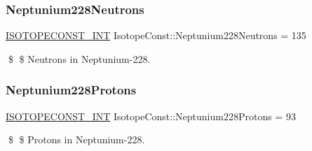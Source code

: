 \subsubsection{\texorpdfstring{Neptunium228\+Neutrons}{Neptunium228Neutrons}}
{\footnotesize\ttfamily \mbox{\hyperlink{group___isotope_const-_macros_ga5f18360b3e99483a35c32d789e62621c}{I\+S\+O\+T\+O\+P\+E\+C\+O\+N\+S\+T\+\_\+\+I\+NT}} Isotope\+Const\+::\+Neptunium228\+Neutrons = 135}

\$ \$ Neutrons in Neptunium-\/228. \mbox{\label{group___isotope_const-_neptunium-_np228_gad42a10ea338e37a020cce2d7ab9047d4}} 
\subsubsection{\texorpdfstring{Neptunium228\+Protons}{Neptunium228Protons}}
{\footnotesize\ttfamily \mbox{\hyperlink{group___isotope_const-_macros_ga5f18360b3e99483a35c32d789e62621c}{I\+S\+O\+T\+O\+P\+E\+C\+O\+N\+S\+T\+\_\+\+I\+NT}} Isotope\+Const\+::\+Neptunium228\+Protons = 93}

\$ \$ Protons in Neptunium-\/228. 